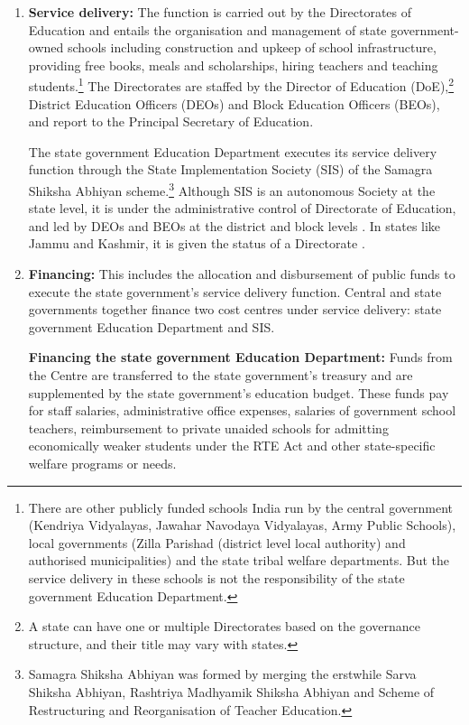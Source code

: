 \documentclass[a4paper, 12pt, twoside]{article}
\begin{document}
\begin{enumerate}
\begin{enumerate}
\end{enumerate}
\item \textbf{Service delivery:} The function is carried out by the Directorates of Education and entails the organisation and management of state government-owned schools including construction and upkeep of school infrastructure, providing free books, meals and scholarships, hiring teachers and teaching students.\footnote{There are other publicly funded schools India run by the central government (Kendriya Vidyalayas, Jawahar Navodaya Vidyalayas, Army Public Schools), local governments (Zilla Parishad (district level local authority) and authorised municipalities) and the state tribal welfare departments. But the service delivery in these schools is not the responsibility of the state government Education Department.} The Directorates are staffed by the Director of Education (DoE),\footnote{A state can have one or multiple Directorates based on the governance structure, and their title may vary with states.}  District Education Officers (DEOs) and Block Education Officers (BEOs), and report to the Principal Secretary of Education.

The state government Education Department executes its service delivery function through the State Implementation Society (SIS) of the Samagra Shiksha Abhiyan scheme.\footnote{Samagra Shiksha Abhiyan was formed by merging the erstwhile Sarva Shiksha Abhiyan, Rashtriya Madhyamik Shiksha Abhiyan and Scheme of Restructuring and Reorganisation of Teacher Education.} Although SIS is an autonomous Society at the state level, it is under the administrative control of Directorate of Education, and led by DEOs and BEOs at the district and block levels \parencite{ssa_guide}. In states like Jammu and Kashmir, it is given the status of a Directorate \parencite{jnk_ssa}.  
\item \textbf{Financing:} This includes the allocation and disbursement of public funds to execute the state government’s service delivery function. Central and state governments together finance two cost centres under service delivery: state government Education Department and SIS.

\textbf{Financing the state government Education Department:} Funds from the Centre are transferred to the state government’s treasury and are supplemented by the state government’s education budget. These funds pay for staff salaries, administrative office expenses, salaries of government school teachers, reimbursement to private unaided schools for admitting economically weaker students under the RTE Act and other state-specific welfare programs or needs.


\end{enumerate}
\end{document}
